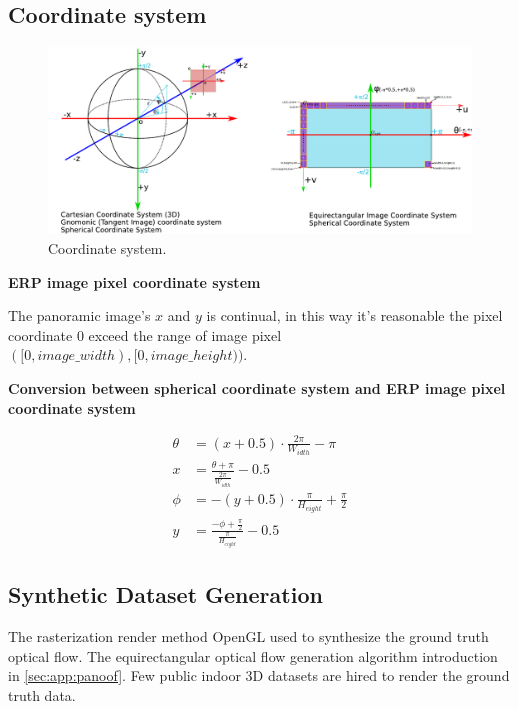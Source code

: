 \subsection{Coordinate system}



\begin{figure}[h]
	\centering
	\includegraphics[width=1.0\linewidth]{images/coordinate_system.pdf}
	\caption{Coordinate system.}
	\label{fig:supp:coordinatesystem}
\end{figure}

\textbf{ERP image pixel coordinate system}

The panoramic image's $x$ and $y$ is continual, in this way it's reasonable the pixel coordinate 0 exceed the range of image pixel $([0, image\_width), [0, image\_height))$. 


\textbf{Conversion between spherical coordinate system and ERP image pixel coordinate system}


\begin{equation}\label{equ:app:sph2erp}
	\begin{split}
		\theta &= (x+0.5) \cdot\frac{2 \pi}{W_{idth}}- \pi
		\\
		x &= \frac{\theta + \pi}{\frac{2\pi}{W_{idth}}} - 0.5
		\\
		\phi&=-(y+0.5) \cdot \frac{\pi}{H_{eight}} + \frac{\pi}{2}
		\\
		y &=\frac{-\phi+\frac{\pi}{2}}{\frac{\pi}{H_{eight}}}-0.5
	\end{split}
\end{equation}


\subsection{Synthetic Dataset Generation}

The rasterization render method OpenGL used to synthesize the ground truth optical flow.
The equirectangular optical flow generation algorithm introduction in \cref{sec:app:panoof}.
Few public indoor 3D datasets are hired to render the ground truth data.


